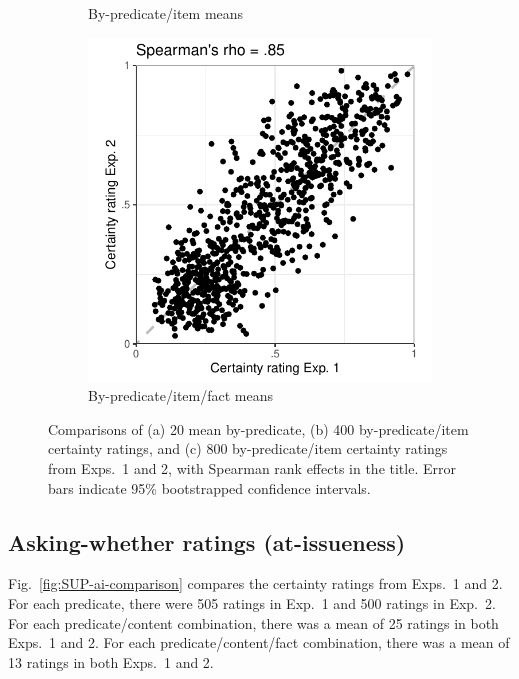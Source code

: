\documentclass[11pt,fleqn]{article}
\newcommand{\6}{\mbox{$[\hspace*{-.6mm}[$}}
\newcommand{\9}{\mbox{$]\hspace*{-.6mm}]$}}
\begin{document}
\begin{figure}[h!]
\begin{subfigure}[t]{.3\textwidth}
\caption{By-predicate/item means}
\end{subfigure}\hfill
\begin{subfigure}[t]{.3\textwidth}
\centering
\includegraphics[width=\textwidth]{../../results/exp1/graphs/SUP-certainty-PredItemFact-Exp1-by-Exp2}
\caption{By-predicate/item/fact means}
\end{subfigure}  
\caption{Comparisons of (a) 20 mean by-predicate, (b) 400 by-predicate/item certainty ratings, and (c) 800 by-predicate/item certainty ratings from Exps.~1 and 2,  with Spearman rank effects in the title. Error bars indicate 95\% bootstrapped confidence intervals.}\label{fig:SUP-certainty-comparison}
\end{figure}

\newpage

\subsection{Asking-whether ratings (at-issueness)}

Fig.~\ref{fig:SUP-ai-comparison} compares the certainty ratings from Exps.~1 and 2. For each predicate, there were 505 ratings in Exp.~1 and 500 ratings in Exp.~2. For each predicate/content combination, there was a mean of 25 ratings in both Exps.~1 and 2. For each predicate/content/fact combination, there was a mean of 13 ratings in both Exps.~1 and 2.
\end{document}
